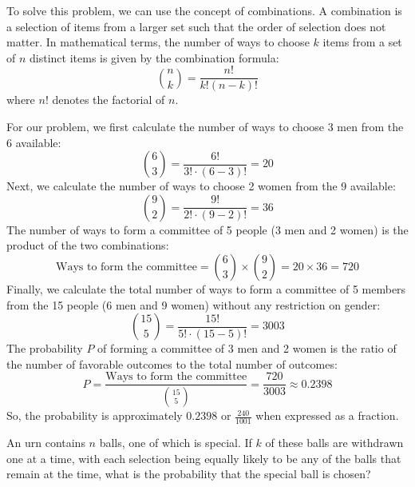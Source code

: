        \begin{solution}
        To solve this problem, we can use the concept of combinations. A combination is a selection of items from a larger set such that the order of selection does not matter. In mathematical terms, the number of ways to choose $k$ items from a set of $n$ distinct items is given by the combination formula:
        \[
        \binom{n}{k} = \frac{n!}{k!(n-k)!}
        \]
        where $n!$ denotes the factorial of $n$.
        
        For our problem, we first calculate the number of ways to choose 3 men from the 6 available:
        \[
        \binom{6}{3} = \frac{6!}{3! \cdot (6-3)!} = 20
        \]
        Next, we calculate the number of ways to choose 2 women from the 9 available:
        \[
        \binom{9}{2} = \frac{9!}{2! \cdot (9-2)!} = 36
        \]
        The number of ways to form a committee of 5 people (3 men and 2 women) is the product of the two combinations:
        \[
        \text{Ways to form the committee} = \binom{6}{3} \times \binom{9}{2} = 20 \times 36 = 720
        \]
        Finally, we calculate the total number of ways to form a committee of 5 members from the 15 people (6 men and 9 women) without any restriction on gender:
        \[
        \binom{15}{5} = \frac{15!}{5! \cdot (15-5)!} = 3003
        \]
        The probability $P$ of forming a committee of 3 men and 2 women is the ratio of the number of favorable outcomes to the total number of outcomes:
        \[
        P = \frac{\text{Ways to form the committee}}{\binom{15}{5}} = \frac{720}{3003} \approx 0.2398
        \]
        So, the probability is approximately $0.2398$ or $\frac{240}{1001}$ when expressed as a fraction.
        \end{solution}
        
        \begin{example}
            An urn contains \(n\) balls, one of which is special. If \(k\) of these balls are withdrawn one at a time, with each selection being equally likely to be any of the balls that remain at the time, what is the probability that the special ball is chosen?
            \end{example}
            

